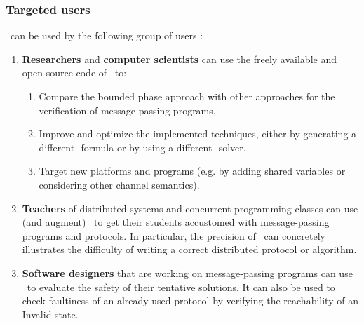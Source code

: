\subsubsection{Targeted users}
%
\MPass\ can be used by the following group of users :
%
\begin{enumerate}
%
\item \textbf{Researchers} and \textbf{computer scientists} can use the freely available and open source code of \MPass\ to:
\begin{enumerate}
\item Compare the bounded phase approach with other approaches for the verification of message-passing programs,
\item Improve and optimize the implemented techniques,
either by generating a different \SMT-formula or by using a different \SMT-solver.
\item Target new platforms and programs (e.g. by adding shared variables or considering other channel semantics).
\end{enumerate}
%  
\item \textbf{Teachers} of distributed  systems  and concurrent programming classes can use (and augment) \MPass\ 
  to get their students accustomed with message-passing programs and protocols.
  In particular, the precision of \MPass\ can concretely illustrates the difficulty of writing a correct distributed protocol or algorithm.
%
\item \textbf{Software designers} that are working on message-passing programs can use \MPass\ to evaluate the safety of their tentative solutions.
  It can also be used to check faultiness of an already used protocol by verifying the reachability of an Invalid state.
%
\end{enumerate}